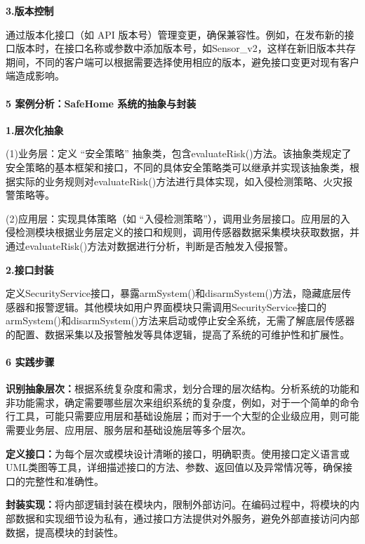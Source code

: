 \textbf{3.版本控制}

通过版本化接口（如 API 版本号）管理变更，确保兼容性。例如，在发布新的接口版本时，在接口名称或参数中添加版本号，如Sensor\_v2，这样在新旧版本共存期间，不同的客户端可以根据需要选择使用相应的版本，避免接口变更对现有客户端造成影响。

\paragraph{5 案例分析：SafeHome 系统的抽象与封装}\label{ux6848ux4f8bux5206ux6790safehome-ux7cfbux7edfux7684ux62bdux8c61ux4e0eux5c01ux88c5}

\textbf{1.层次化抽象}

(1)业务层：定义 ``安全策略'' 抽象类，包含evaluateRisk()方法。该抽象类规定了安全策略的基本框架和接口，不同的具体安全策略类可以继承并实现该抽象类，根据实际的业务规则对evaluateRisk()方法进行具体实现，如入侵检测策略、火灾报警策略等。

(2)应用层：实现具体策略（如 ``入侵检测策略''），调用业务层接口。应用层的入侵检测模块根据业务层定义的接口和规则，调用传感器数据采集模块获取数据，并通过evaluateRisk()方法对数据进行分析，判断是否触发入侵报警。

\textbf{2.接口封装}

定义SecurityService接口，暴露armSystem()和disarmSystem()方法，隐藏底层传感器和报警逻辑。其他模块如用户界面模块只需调用SecurityService接口的armSystem()和disarmSystem()方法来启动或停止安全系统，无需了解底层传感器的配置、数据采集以及报警触发等具体逻辑，提高了系统的可维护性和扩展性。

\paragraph{6 实践步骤}\label{ux5b9eux8df5ux6b65ux9aa4-1}

\textbf{识别抽象层次：}根据系统复杂度和需求，划分合理的层次结构。分析系统的功能和非功能需求，确定需要哪些层次来组织系统的复杂度，例如，对于一个简单的命令行工具，可能只需要应用层和基础设施层；而对于一个大型的企业级应用，则可能需要业务层、应用层、服务层和基础设施层等多个层次。

\textbf{定义接口：}为每个层次或模块设计清晰的接口，明确职责。使用接口定义语言或UML类图等工具，详细描述接口的方法、参数、返回值以及异常情况等，确保接口的完整性和准确性。

\textbf{封装实现：}将内部逻辑封装在模块内，限制外部访问。在编码过程中，将模块的内部数据和实现细节设为私有，通过接口方法提供对外服务，避免外部直接访问内部数据，提高模块的封装性。


